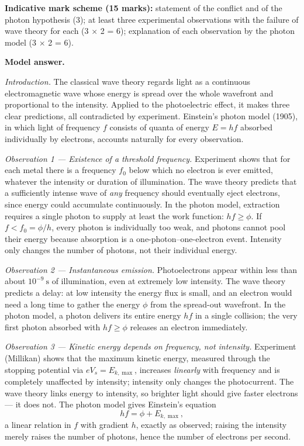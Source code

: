 \documentclass[11pt]{article}
\begin{document}
\begin{corrige}
\textbf{Indicative mark scheme (15 marks):} statement of the conflict and of the photon hypothesis (3); at least three experimental observations with the failure of wave theory for each (3 $\times$ 2 = 6); explanation of each observation by the photon model (3 $\times$ 2 = 6).

\textbf{Model answer.}

\emph{Introduction.} The classical wave theory regards light as a continuous electromagnetic wave whose energy is spread over the whole wavefront and proportional to the intensity. Applied to the photoelectric effect, it makes three clear predictions, all contradicted by experiment. Einstein's photon model (1905), in which light of frequency $f$ consists of quanta of energy $E = hf$ absorbed individually by electrons, accounts naturally for every observation.

\emph{Observation 1 — Existence of a threshold frequency.} Experiment shows that for each metal there is a frequency $f_0$ below which no electron is ever emitted, whatever the intensity or duration of illumination. The wave theory predicts that a sufficiently intense wave of \emph{any} frequency should eventually eject electrons, since energy could accumulate continuously. In the photon model, extraction requires a single photon to supply at least the work function: $hf \geq \phi$. If $f < f_0 = \phi/h$, every photon is individually too weak, and photons cannot pool their energy because absorption is a one-photon–one-electron event. Intensity only changes the number of photons, not their individual energy.

\emph{Observation 2 — Instantaneous emission.} Photoelectrons appear within less than about $10^{-9}\ \mathrm{s}$ of illumination, even at extremely low intensity. The wave theory predicts a delay: at low intensity the energy flux is small, and an electron would need a long time to gather the energy $\phi$ from the spread-out wavefront. In the photon model, a photon delivers its entire energy $hf$ in a single collision; the very first photon absorbed with $hf \geq \phi$ releases an electron immediately.

\emph{Observation 3 — Kinetic energy depends on frequency, not intensity.} Experiment (Millikan) shows that the maximum kinetic energy, measured through the stopping potential via $eV_s = E_{k,\max}$, increases \emph{linearly} with frequency and is completely unaffected by intensity; intensity only changes the photocurrent. The wave theory links energy to intensity, so brighter light should give faster electrons — it does not. The photon model gives Einstein's equation
\[ hf = \phi + E_{k,\max}, \]
a linear relation in $f$ with gradient $h$, exactly as observed; raising the intensity merely raises the number of photons, hence the number of electrons per second.


\end{corrige}
\end{document}
